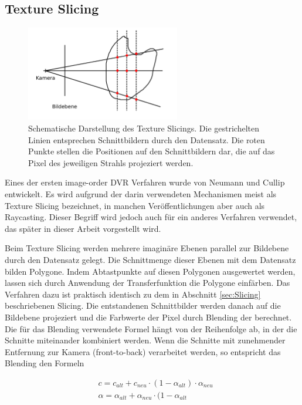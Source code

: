 \documentclass[a4paper,fontsize=12pt,toc=bib,halfparskip]{scrartcl}
\begin{document}
\subsection{Texture Slicing}
\begin{figure}
	\centering
	\includegraphics[width=0.6\textwidth]{pictures/Texture_Slicing}
	\caption{Schematische Darstellung des Texture Slicings. Die gestrichelten Linien entsprechen Schnittbildern durch den Datensatz. Die roten Punkte stellen die Positionen auf den Schnittbildern dar, die auf das Pixel des jeweiligen Strahls projeziert werden.}
	\label{TexureSlicing}
\end{figure}
\label{sec:TextureSlicing}
Eines der ersten image-order DVR Verfahren wurde von Neumann und Cullip \cite{cullip1993accelerating} entwickelt. Es wird aufgrund der darin verwendeten Mechanismen meist als Texture Slicing bezeichnet, in manchen Ver\"offentlichungen aber auch als Raycasting. Dieser Begriff wird jedoch auch f\"ur ein anderes Verfahren verwendet, das sp\"ater in dieser Arbeit vorgestellt wird.

Beim Texture Slicing werden mehrere imagin\"are Ebenen parallel zur Bildebene durch den Datensatz gelegt. Die Schnittmenge dieser Ebenen mit dem Datensatz bilden Polygone. Indem Abtastpunkte auf diesen Polygonen ausgewertet werden, lassen sich durch Anwendung der Transferfunktion die Polygone einf\"arben. Das Verfahren dazu ist praktisch identisch zu dem in Abschnitt \ref{sec:Slicing} beschriebenen Slicing. Die entstandenen Schnittbilder werden danach auf die Bildebene projeziert und die Farbwerte der Pixel durch Blending der berechnet. Die f\"ur das Blending verwendete Formel h\"angt von der Reihenfolge ab, in der die Schnitte miteinander kombiniert werden. Wenn die Schnitte mit zunehmender Entfernung zur Kamera (front-to-back) verarbeitet werden, so entspricht das Blending den Formeln

\begin{align}
&c = c_{alt} + c_{neu}\cdot(1-\alpha_{alt})\cdot\alpha_{neu}
\label{front-to-back-color}\\ 
&\alpha = \alpha_{alt} + \alpha_{neu}\cdot(1-\alpha_{alt} 
\label{front-to-back-alpha}
\end{align}
\end{document}
